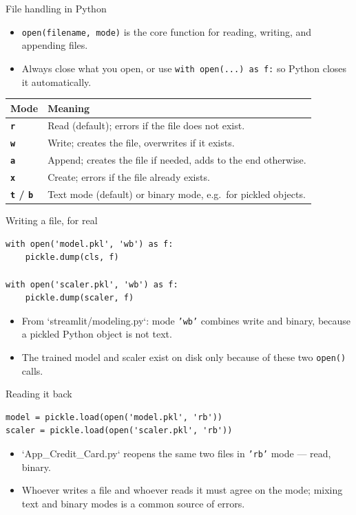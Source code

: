 \begin{frame}{File handling in Python}
\begin{itemize}
\item \texttt{open(filename, mode)} is the core function for reading, writing, and appending files.
\item Always close what you open, or use \texttt{with open(...) as f:} so Python closes it automatically.
\end{itemize}
\begin{tabularx}{\textwidth}{>{\bfseries}l X}
Mode & Meaning \\
\toprule
\texttt{r} & Read (default); errors if the file does not exist. \\
\texttt{w} & Write; creates the file, overwrites if it exists. \\
\texttt{a} & Append; creates the file if needed, adds to the end otherwise. \\
\texttt{x} & Create; errors if the file already exists. \\
\texttt{t} / \texttt{b} & Text mode (default) or binary mode, e.g.\ for pickled objects. \\
\bottomrule
\end{tabularx}
\coursefooter
\end{frame}

\begin{frame}[fragile]{Writing a file, for real}
\begin{lstlisting}[style=coursepython]
with open('model.pkl', 'wb') as f:
    pickle.dump(cls, f)

with open('scaler.pkl', 'wb') as f:
    pickle.dump(scaler, f)
\end{lstlisting}
\begin{itemize}
\item From `streamlit/modeling.py`: mode \texttt{'wb'} combines write and binary, because a pickled Python object is not text.
\item The trained model and scaler exist on disk only because of these two \texttt{open()} calls.
\end{itemize}
\coursefooter
\end{frame}

\begin{frame}[fragile]{Reading it back}
\begin{lstlisting}[style=coursepython]
model = pickle.load(open('model.pkl', 'rb'))
scaler = pickle.load(open('scaler.pkl', 'rb'))
\end{lstlisting}
\begin{itemize}
\item `App_Credit_Card.py` reopens the same two files in \texttt{'rb'} mode --- read, binary.
\item Whoever writes a file and whoever reads it must agree on the mode; mixing text and binary modes is a common source of errors.
\end{itemize}
\coursefooter
\end{frame}

